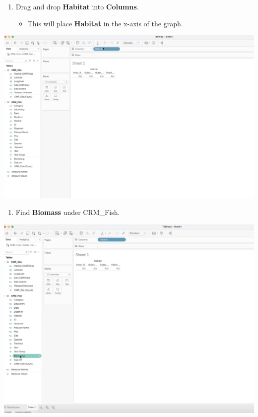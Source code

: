 \documentclass[
]{book}
\providecommand{\tightlist}{%
  \setlength{\itemsep}{0pt}\setlength{\parskip}{0pt}}
\begin{document}
\begin{enumerate}
\def\labelenumi{\arabic{enumi}.}
\setcounter{enumi}{1}
\tightlist
\item
  Drag and drop \textbf{Habitat} into \textbf{Columns}.

  \begin{itemize}
  \tightlist
  \item
    This will place \textbf{Habitat} in the x-axis of the graph.
  \end{itemize}
\end{enumerate}

\includegraphics{images/M3S2_drag-habitat.png}

\begin{enumerate}
\def\labelenumi{\arabic{enumi}.}
\setcounter{enumi}{2}
\tightlist
\item
  Find \textbf{Biomass} under CRM\_Fish.
\end{enumerate}

\includegraphics{images/M3S2_find-biomass.png}
\end{document}
